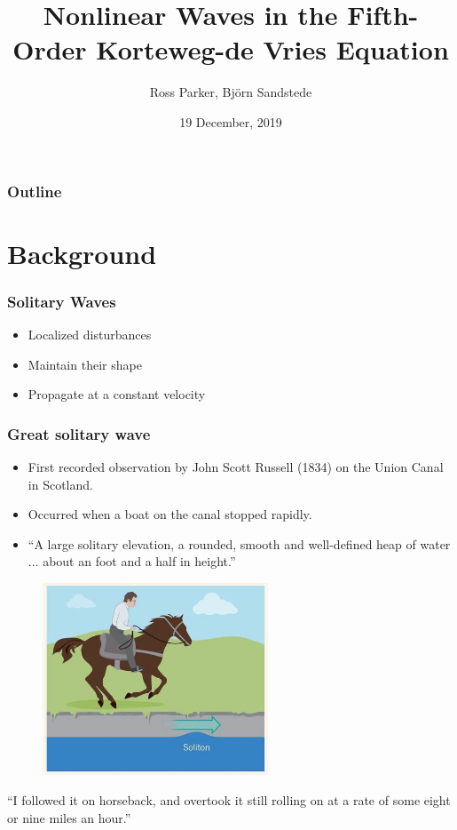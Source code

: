\documentclass[16pt]{beamer}
\title[5th order KdV Equation]{Nonlinear Waves in the Fifth-Order Korteweg-de Vries Equation}
\author[R. Parker]{Ross Parker, Bj\"{o}rn Sandstede}
\institute{Brown University}
\date{19 December, 2019}
\begin{document}
 
\frame{\titlepage}
 
\begin{frame}
\frametitle{Outline}
\tableofcontents
\end{frame}

\section{Background}

\begin{frame}
	\fontsize{18}{7.2}\selectfont
	\frametitle{ Solitary Waves }   
	\begin{itemize}
		\item Localized disturbances 
		\vspace{0.5cm}
		\item Maintain their shape
		\vspace{0.5cm}
		\item Propagate at a constant velocity
	\end{itemize}
\end{frame}

\begin{frame}
	\fontsize{18}{7.2}\selectfont
	\frametitle{ Great solitary wave }   
	\begin{itemize}
		\item First recorded observation by John Scott Russell (1834) on the Union Canal in Scotland.
		\vspace{0.5cm}
		\item Occurred when a boat on the canal stopped rapidly.
		\vspace{0.5cm}
		\item ``A large solitary elevation, a rounded, smooth and well-defined heap of water ...  about an foot and a half in height.''
	\end{itemize}
\end{frame}

\begin{frame}
\fontsize{18}{7.2}\selectfont
\begin{figure}[H]
\centering
\includegraphics[width=0.6\textwidth]{images/horsebefore.jpg}
\end{figure}
``I followed it on horseback, and overtook it still rolling on at a rate of some eight or nine miles an hour.''
\end{frame}
\end{document}
